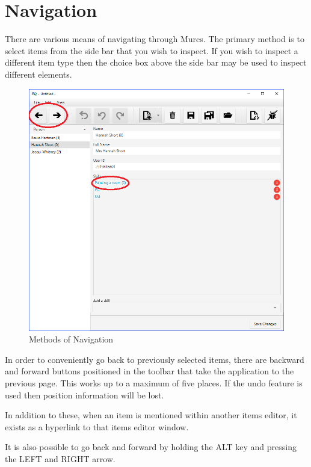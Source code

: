 \section{Navigation}

There are various means of navigating through Murcs. The primary method is to select items from the side bar that you wish to inspect. If you wish to inspect a different item type then the choice box above the side bar may be used to inspect different elements.

\begin{figure}[H]
\centering
\includegraphics[width=\textwidth]{images/screenshots/navigation.PNG}
\caption{Methods of Navigation}
\label{fig:new_project}
\end{figure}

In order to conveniently go back to previously selected items, there are backward and forward buttons positioned in the toolbar that take the application to the previous page. This works up to a maximum of five places. If the undo feature is used then position information will be lost.

In addition to these, when an item is mentioned within another items editor, it exists as a hyperlink to that items editor window.

It is also possible to go back and forward by holding the ALT key and pressing the LEFT and RIGHT arrow.